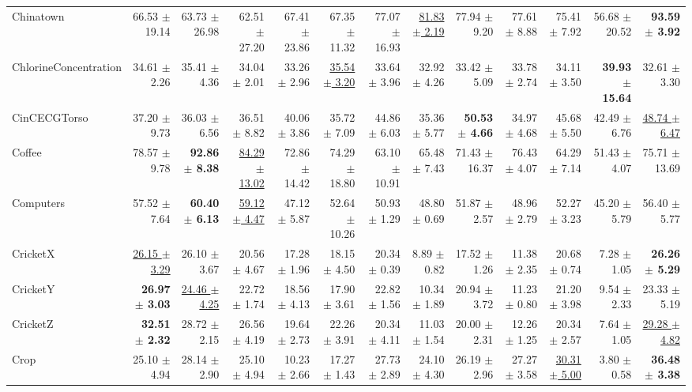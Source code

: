 \begin{landscape}
\begin{longtable}{lrrrrrrrrrrrr}
Chinatown & 66.53 $\pm$ 19.14 & 63.73 $\pm$ 26.98 & 62.51 $\pm$ 27.20 & 67.41 $\pm$ 23.86 & 67.35 $\pm$ 11.32 & 77.07 $\pm$ 16.93 & \underline{81.83 $\pm$ 2.19} & 77.94 $\pm$ 9.20 & 77.61 $\pm$ 8.88 & 75.41 $\pm$ 7.92 & 56.68 $\pm$ 20.52 & \textbf{93.59 $\pm$ 3.92} \\
ChlorineConcentration & 34.61 $\pm$ 2.26 & 35.41 $\pm$ 4.36 & 34.04 $\pm$ 2.01 & 33.26 $\pm$ 2.96 & \underline{35.54 $\pm$ 3.20} & 33.64 $\pm$ 3.96 & 32.92 $\pm$ 4.26 & 33.42 $\pm$ 5.09 & 33.78 $\pm$ 2.74 & 34.11 $\pm$ 3.50 & \textbf{39.93 $\pm$ 15.64} & 32.61 $\pm$ 3.30 \\
CinCECGTorso & 37.20 $\pm$ 9.73 & 36.03 $\pm$ 6.56 & 36.51 $\pm$ 8.82 & 40.06 $\pm$ 3.86 & 35.72 $\pm$ 7.09 & 44.86 $\pm$ 6.03 & 35.36 $\pm$ 5.77 & \textbf{50.53 $\pm$ 4.66} & 34.97 $\pm$ 4.68 & 45.68 $\pm$ 5.50 & 42.49 $\pm$ 6.76 & \underline{48.74 $\pm$ 6.47} \\
Coffee & 78.57 $\pm$ 9.78 & \textbf{92.86 $\pm$ 8.38} & \underline{84.29 $\pm$ 13.02} & 72.86 $\pm$ 14.42 & 74.29 $\pm$ 18.80 & 63.10 $\pm$ 10.91 & 65.48 $\pm$ 7.43 & 71.43 $\pm$ 16.37 & 76.43 $\pm$ 4.07 & 64.29 $\pm$ 7.14 & 51.43 $\pm$ 4.07 & 75.71 $\pm$ 13.69 \\
Computers & 57.52 $\pm$ 7.64 & \textbf{60.40 $\pm$ 6.13} & \underline{59.12 $\pm$ 4.47} & 47.12 $\pm$ 5.87 & 52.64 $\pm$ 10.26 & 50.93 $\pm$ 1.29 & 48.80 $\pm$ 0.69 & 51.87 $\pm$ 2.57 & 48.96 $\pm$ 2.79 & 52.27 $\pm$ 3.23 & 45.20 $\pm$ 5.79 & 56.40 $\pm$ 5.77 \\
CricketX & \underline{26.15 $\pm$ 3.29} & 26.10 $\pm$ 3.67 & 20.56 $\pm$ 4.67 & 17.28 $\pm$ 1.96 & 18.15 $\pm$ 4.50 & 20.34 $\pm$ 0.39 & 8.89 $\pm$ 0.82 & 17.52 $\pm$ 1.26 & 11.38 $\pm$ 2.35 & 20.68 $\pm$ 0.74 & 7.28 $\pm$ 1.05 & \textbf{26.26 $\pm$ 5.29} \\
CricketY & \textbf{26.97 $\pm$ 3.03} & \underline{24.46 $\pm$ 4.25} & 22.72 $\pm$ 1.74 & 18.56 $\pm$ 4.13 & 17.90 $\pm$ 3.61 & 22.82 $\pm$ 1.56 & 10.34 $\pm$ 1.89 & 20.94 $\pm$ 3.72 & 11.23 $\pm$ 0.80 & 21.20 $\pm$ 3.98 & 9.54 $\pm$ 2.33 & 23.33 $\pm$ 5.19 \\
CricketZ & \textbf{32.51 $\pm$ 2.32} & 28.72 $\pm$ 2.15 & 26.56 $\pm$ 4.19 & 19.64 $\pm$ 2.73 & 22.26 $\pm$ 3.91 & 20.34 $\pm$ 4.11 & 11.03 $\pm$ 1.54 & 20.00 $\pm$ 2.31 & 12.26 $\pm$ 1.25 & 20.34 $\pm$ 2.57 & 7.64 $\pm$ 1.05 & \underline{29.28 $\pm$ 4.82} \\
Crop & 25.10 $\pm$ 4.94 & 28.14 $\pm$ 2.90 & 25.10 $\pm$ 4.94 & 10.23 $\pm$ 2.66 & 17.27 $\pm$ 1.43 & 27.73 $\pm$ 2.89 & 24.10 $\pm$ 4.30 & 26.19 $\pm$ 2.96 & 27.27 $\pm$ 3.58 & \underline{30.31 $\pm$ 5.00} & 3.80 $\pm$ 0.58 & \textbf{36.48 $\pm$ 3.38} \\

\end{longtable}
\end{landscape}
